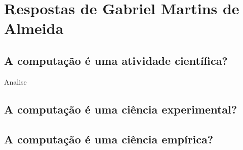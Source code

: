 \section{Respostas de Gabriel Martins de Almeida}

\subsection{A computação é uma atividade científica?}
\gls{Analise}

\subsection{A computação é uma ciência experimental?}

\subsection{A computação é uma ciência empírica?}